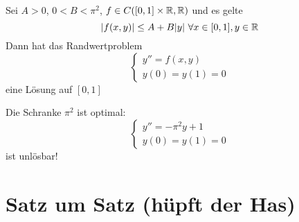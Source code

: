 \documentclass[a4paper,twoside,DIV15,BCOR12mm]{scrbook}
\begin{document}
\begin{satz}
Sei $A>0$, $0<B<\pi^2$, $f\in C([0,1]\times \mathbb{R}, \mathbb{R})$ und es gelte
\[|f(x,y)|\le A+ B|y| \ \forall x\in[0,1], y\in\mathbb{R}\]
Dann hat das Randwertproblem
\[ \begin{cases} y'' = f(x,y) \\ y(0) = y(1) = 0 \end{cases} \]
eine Lösung auf $[0,1]$
\end{satz}

\begin{bemerkung}
Die Schranke $\pi^2$ ist optimal:
\[ \begin{cases} y'' = -\pi^2y + 1 \\ y(0) = y(1) = 0 \end{cases} \]
ist unlösbar!
\end{bemerkung}


\appendix
\chapter{Satz um Satz (hüpft der Has)}

\renewcommand{\indexname}{Stichwortverzeichnis}
\printindex
\end{document}
